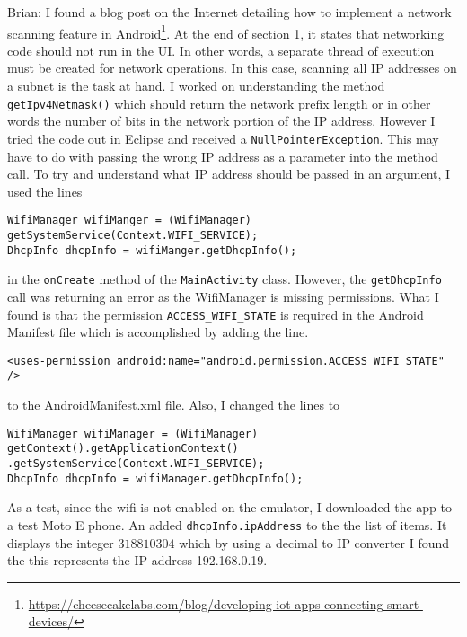 \documentclass[fontsize=11pt, %
                             paper=a4, %
                             twoside, %
                             captions=tableheading,
                             index=totoc,
                             hyperref]{labbook}
\begin{document}
\begin{addmargin}[0cm]{0cm}
Brian:
I found a blog post on the Internet detailing how to implement a network scanning feature in Android\footnote{\url{https://cheesecakelabs.com/blog/developing-iot-apps-connecting-smart-devices/}}. At the end of section 1, it states that networking code should not run in the UI. In other words, a separate thread of execution must be created for network operations. In this case, scanning all IP addresses on a subnet is the task at hand. I worked on understanding the method \texttt{getIpv4Netmask()} which should return the network prefix length or in other words the number of bits in the network portion of the IP address. However I tried the code out in Eclipse and received a \texttt{NullPointerException}. This may have to do with passing the wrong IP address as a parameter into the method call. To try and understand what IP address should be passed in an argument, I used the lines
\begin{Verbatim}
WifiManager wifiManger = (WifiManager) getSystemService(Context.WIFI_SERVICE);
DhcpInfo dhcpInfo = wifiManger.getDhcpInfo();
\end{Verbatim}
in the \texttt{onCreate} method of the \texttt{MainActivity} class. However, the  \texttt{getDhcpInfo} call was returning an error as the WifiManager is missing permissions. What I found is that the permission \texttt{ACCESS\_WIFI\_STATE} is required in the Android Manifest file which is accomplished by adding the line.
\begin{Verbatim}
<uses-permission android:name="android.permission.ACCESS_WIFI_STATE" />
\end{Verbatim}
to the AndroidManifest.xml file. Also, I changed the lines to 
\begin{Verbatim}
WifiManager wifiManager = (WifiManager) getContext().getApplicationContext()
.getSystemService(Context.WIFI_SERVICE);
DhcpInfo dhcpInfo = wifiManager.getDhcpInfo();
\end{Verbatim}
As a test, since the wifi is not enabled on the emulator, I downloaded the app to a test Moto E phone. An added \texttt{dhcpInfo.ipAddress} to the the list of items. It displays the integer $318810304$ which by using a decimal to IP converter I found the this represents the IP address 192.168.0.19.


\end{addmargin}
\end{document}
